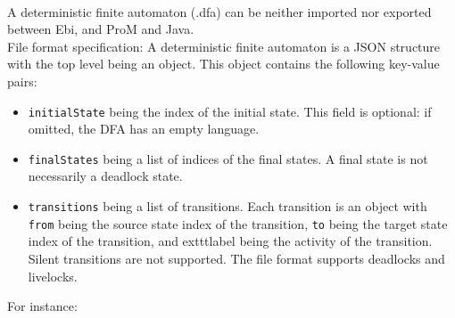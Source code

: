{\\A deterministic finite automaton (.dfa) can be neither imported nor exported between Ebi, and ProM and Java.
\\File format specification:
A deterministic finite automaton is a JSON structure with the top level being an object.
    This object contains the following key-value pairs:
    \begin{itemize}
    \item \texttt{initialState} being the index of the initial state. This field is optional: if omitted, the DFA has an empty language.
    \item \texttt{finalStates} being a list of indices of the final states.
    A final state is not necessarily a deadlock state.
    \item \texttt{transitions} being a list of transitions. 
    Each transition is an object with \texttt{from} being the source state index of the transition, \texttt{to} being the target state index of the transition, and 	exttt{{label}} being the activity of the transition. 
    Silent transitions are not supported.
    The file format supports deadlocks and livelocks.
    \end{itemize}
    For instance:
    
\clearpage
}
